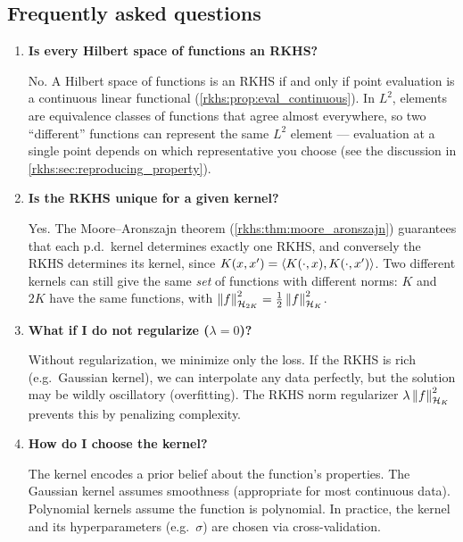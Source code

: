 \begin{notechapter}
\section{Frequently asked questions}
\label{rkhs:sec:faq}

\begin{enumerate}[label=\emph{Q\arabic*.}, leftmargin=*, itemsep=10pt]

\item \textbf{Is every Hilbert space of functions an RKHS?}

No. A Hilbert space of functions is an RKHS if and only
if point evaluation is a continuous linear functional
(\cref{rkhs:prop:eval_continuous}). In $L^2$,
elements are equivalence classes of functions that
agree almost everywhere, so two ``different'' functions
can represent the same $L^2$ element --- evaluation at
a single point depends on which representative you
choose (see the discussion in
\cref{rkhs:sec:reproducing_property}).

\item \textbf{Is the RKHS unique for a given kernel?}

Yes. The Moore--Aronszajn theorem (\cref{rkhs:thm:moore_aronszajn})
guarantees that each p.d.\ kernel determines exactly one RKHS, and conversely the RKHS determines its kernel, since $K(x,x') = \left\langle K(\cdot,x), K(\cdot,x') \right\rangle$. Two different kernels can still give the same \emph{set} of functions with different norms: $K$ and $2K$ have the same functions, with $\left\|f\right\|_{\mathcal H_{2K}}^2 = \frac12\left\|f\right\|_{\mathcal{H}_K}^2$.

\item \textbf{What if I do not regularize ($\lambda = 0$)?}

Without regularization, we minimize only the loss. If the RKHS is rich
(e.g.\ Gaussian kernel), we can interpolate any data perfectly, but the
solution may be wildly oscillatory (overfitting). The RKHS norm
regularizer $\lambda\left\|f\right\|_{\mathcal{H}_K}^2$ prevents this by penalizing
complexity.

\item \textbf{How do I choose the kernel?}

The kernel encodes a prior belief about the function's properties. The
Gaussian kernel assumes smoothness (appropriate for most continuous
data). Polynomial kernels assume the function is polynomial. In
practice, the kernel and its hyperparameters (e.g.\ $\sigma$) are chosen
via cross-validation.


\end{enumerate}
\end{notechapter}
